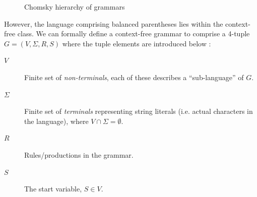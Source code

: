 \documentclass[a4paper,openany,12pt]{book}
\begin{document}
\begin{figure}[H]
    \begin{MyMdframed}
        \vspace{0.5em}
        \caption{\label{fig:chomsky:1} Chomsky hierarchy of grammars}
        \vspace{0.5em}
        \captionsetup{style=default}
        \begin{adjustbox}{center} 
        \end{adjustbox}
    \end{MyMdframed}
\end{figure}

However, the language comprising balanced parentheses lies within the context-free class.
We can formally define a context-free grammar to comprise a 4-tuple $G = (V, \Sigma, R, S)$ where the tuple elements
are introduced below \citep[p.~102]{sipser2012introduction}:

\begin{description}
    \item[$V$] Finite set of \emph{non-terminals}, each of these describes a ``sub-language'' of $G$.
    \item[$\Sigma$] Finite set of \emph{terminals} representing string literals (i.e. actual characters in the language),
                    where $V \cap \Sigma = \emptyset$.
    \item[$R$] Rules/productions in the grammar.
    \item[$S$] The start variable, $S \in V$.
\end{description}
\end{document}
